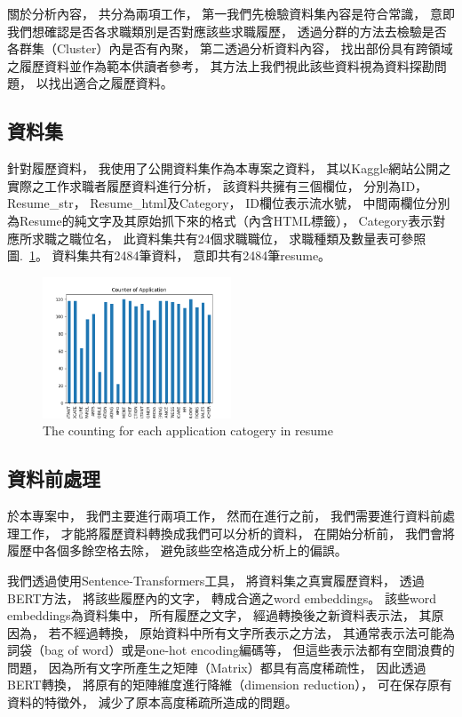 \documentclass[acmsmall]{acmart}
\begin{document}
關於分析內容，
共分為兩項工作，
第一我們先檢驗資料集內容是符合常識，
意即我們想確認是否各求職類別是否對應該些求職履歷，
透過分群的方法去檢驗是否各群集（Cluster）內是否有內聚，
第二透過分析資料內容，
找出部份具有跨領域之履歷資料並作為範本供讀者參考，
其方法上我們視此該些資料視為資料探勘問題\cite{han2011data}，
以找出適合之履歷資料。

\subsection{資料集}

針對履歷資料，
我使用了公開資料集作為本專案之資料，
其以Kaggle網站公開之實際之工作求職者履歷資料進行分析\cite{kaggle_dataset}，
該資料共擁有三個欄位，
分別為ID，
Resume\_str，
Resume\_html及Category，
ID欄位表示流水號，
中間兩欄位分別為Resume的純文字及其原始抓下來的格式（內含HTML標籤），
Category表示對應所求職之職位名，
此資料集共有24個求職職位，
求職種類及數量表可參照圖.~\ref{counter_of_application}。
資料集共有2484筆資料，
意即共有2484筆resume。

\begin{figure}
    \centerline{\includegraphics[width=0.5\textwidth]{counter_of_application.png}}
    \caption{The counting for each application catogery in resume}
    \label{counter_of_application}
\end{figure}

\subsection{資料前處理}

於本專案中，
我們主要進行兩項工作，
然而在進行之前，
我們需要進行資料前處理工作，
才能將履歷資料轉換成我們可以分析的資料，
在開始分析前，
我們會將履歷中各個多餘空格去除，
避免該些空格造成分析上的偏誤。

我們透過使用Sentence-Transformers\cite{reimers-2020-multilingual-sentence-bert}工具，
將資料集之真實履歷資料，
透過BERT方法\cite{devlin2018bert}，
將該些履歷內的文字，
轉成合適之word embeddings。
該些word embeddings為資料集中，
所有履歷之文字，
經過轉換後之新資料表示法，
其原因為，
若不經過轉換，
原始資料中所有文字所表示之方法，
其通常表示法可能為詞袋（bag of word）或是one-hot encoding編碼等，
但這些表示法都有空間浪費的問題，
因為所有文字所產生之矩陣（Matrix）都具有高度稀疏性\cite{schutze2008introduction}，
因此透過BERT轉換\cite{devlin2018bert}，
將原有的矩陣維度進行降維（dimension reduction），
可在保存原有資料的特徵外，
減少了原本高度稀疏所造成的問題。
\end{document}
